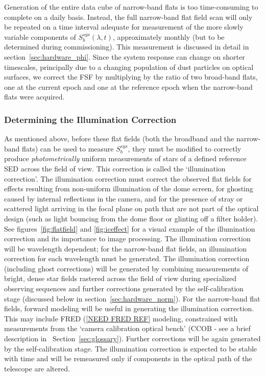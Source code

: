 \documentclass[12pt,preprint]{aastex}
\begin{document}
Generation of the entire data cube of
narrow-band flats is too time-consuming to complete on a daily
basis. Instead, the full narrow-band flat field scan will only be
repeated on a time interval adequate for measurement of
the more slowly variable components of $S_b^{sys}(\lambda,t)$, approximately
monthly (but to be determined during commissioning). This measurement
is discussed in detail in section~\ref{sec:hardware_phi}.  Since the system response can change 
on shorter timescales, principally due to a changing population of dust particles on optical surfaces, we correct the FSF
by multiplying by the ratio of two broad-band flats, one at the current epoch and one at the 
reference epoch when the narrow-band flats were acquired.

\subsubsection{Determining the Illumination Correction}
\label{sec:ic}
As mentioned above, before these flat fields (both the
broadband and the narrow-band flats) can be used to measure
$S_b^{sys}$, they must be modified to correctly produce {\it
photometrically} uniform measurements of stars of a defined reference
SED across the field of view. This correction is called the
`illumination correction'.  The illumination correction must correct
the observed flat fields for effects resulting from non-uniform
illumination of the dome screen, for ghosting caused by internal
reflections in the camera, and for the presence of stray or scattered
light arriving in the focal plane on path that are not part of the
optical design (such as light bouncing from the dome floor or glinting
off a filter holder). See figures~\ref{fig:flatfield} and
\ref{fig:iceffect} for a visual example of the illumination correction
and its importance to image processing. The illumination correction
will be wavelength dependent; for the narrow-band flat fields, an
illumination correction for each wavelength must be generated.  The
illumination correction (including ghost corrections) will be
generated by combining measurements of bright, dense star fields
rastered across the field of view during specialized observing
sequences and further corrections generated by the self-calibration
stage (discussed below in section~\ref{sec:hardware_norm}). For the
narrow-band flat fields, forward modeling will be useful in generating
the illumination correction. This may include FRED (\ref{NEED FRED REF} modeling,
constrained with measurements from the `camera calibration optical
bench' (CCOB - see a brief description in ~Section~\ref{sec:glossary}).
Further corrections will
be again generated by the self-calibration stage.  The illumination correction is
expected to be stable with time and will be remeasured only if components in the
optical path of the telescope are altered.
\end{document}
